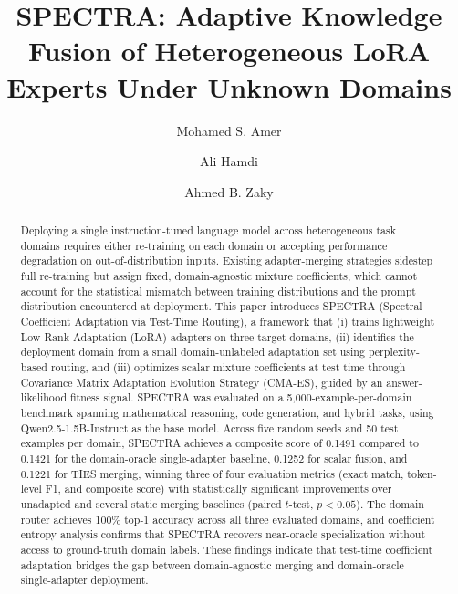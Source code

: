 \documentclass[preprint,12pt]{elsarticle}
\begin{document}
\begin{frontmatter}



\title{SPECTRA: Adaptive Knowledge Fusion of Heterogeneous LoRA Experts Under Unknown Domains}

\author[ejust]{Mohamed S. Amer}
\author[ejust]{Ali Hamdi}
\author[ejust,benha]{Ahmed B. Zaky}
\address[ejust]{Department of Computer Science and Engineering, Egypt-Japan University of Science and Technology (E-JUST), Alexandria, Egypt}
\address[benha]{Faculty of Engineering at shoubra, Benha University, Egypt}

\begin{abstract}
Deploying a single instruction-tuned language model across heterogeneous task
domains requires either re-training on each domain or accepting performance
degradation on out-of-distribution inputs. Existing adapter-merging strategies
sidestep full re-training but assign fixed, domain-agnostic mixture
coefficients, which cannot account for the statistical mismatch between
training distributions and the prompt distribution encountered at deployment.
This paper introduces SPECTRA (Spectral Coefficient Adaptation via Test-Time
Routing), a framework that (i) trains lightweight Low-Rank Adaptation (LoRA)
adapters on three target domains, (ii) identifies the deployment domain from
a small domain-unlabeled adaptation set using perplexity-based routing, and
(iii) optimizes scalar mixture coefficients at test time through Covariance
Matrix Adaptation Evolution Strategy (CMA-ES), guided by an answer-likelihood
fitness signal. SPECTRA was evaluated on a 5,000-example-per-domain benchmark
spanning mathematical reasoning, code generation, and hybrid tasks, using
Qwen2.5-1.5B-Instruct as the base model. Across five random seeds and 50 test
examples per domain, SPECTRA achieves a composite score of 0.1491 compared to
0.1421 for the domain-oracle single-adapter baseline, 0.1252 for scalar fusion,
and 0.1221 for TIES merging, winning three of four evaluation metrics (exact
match, token-level F1, and composite score) with statistically significant
improvements over unadapted and several static merging baselines (paired
$t$-test, $p < 0.05$). The domain router achieves 100\% top-1 accuracy across
all three evaluated domains, and coefficient entropy analysis confirms that
SPECTRA recovers near-oracle specialization without access to ground-truth
domain labels. These findings indicate that test-time coefficient adaptation
bridges the gap between domain-agnostic merging and domain-oracle single-adapter
deployment.
\end{abstract}


\end{frontmatter}
\end{document}
